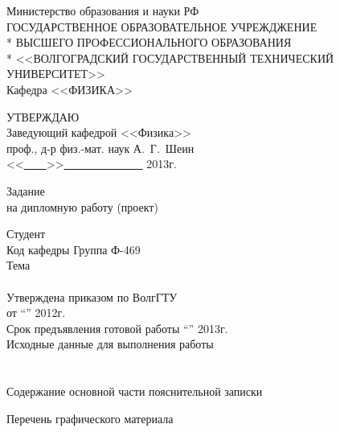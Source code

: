 \begin{titlepage}
\begin{center}
Министерство образования и науки РФ \\
\vspace{.5cm}
ГОСУДАРСТВЕННОЕ ОБРАЗОВАТЕЛЬНОЕ УЧРЕЖДЖЕНИЕ\\*
ВЫСШЕГО ПРОФЕССИОНАЛЬНОГО ОБРАЗОВАНИЯ\\*
<<ВОЛГОГРАДСКИЙ ГОСУДАРСТВЕННЫЙ ТЕХНИЧЕСКИЙ УНИВЕРСИТЕТ>>\\
\vspace{.5cm}
Кафедра <<ФИЗИКА>>
\vspace{.5cm}
\end{center}
\begin{flushright}
УТВЕРЖДАЮ\\
Заведующий кафедрой <<Физика>>\\
проф., д-р физ.-мат. наук А.~Г.~Шеин\\
\vspace{1cm}
<<\underline{\ \ \ \ }>>\underline{\ \ \ \ \ \ \ \ \ \ \ \ \ \ } 2013г.
\end{flushright}
\begin{center}
\large Задание \\
\normalsize на дипломную работу (проект)
\end{center}
\begin{flushleft}
Студент \hrulefill\\
Код кафедры \underline{\hspace{3cm}}\hspace{6cm}Группа Ф-469\\
Тема \hrulefill\\
\hrulefill\\
Утверждена приказом по ВолгГТУ\\
от ``\underline{\hspace{2cm}}''\underline{\hspace{5cm}} 2012г. \No \underline{\hspace{3cm}}\\
Срок предъявления готовой работы ``\underline{\hspace{2cm}}''\underline{\hspace{5cm}} 2013г.\\
Исходные данные для выполнения работы\\
\hrulefill\\
\hrulefill\\
Содержание основной части пояснительной записки

Перечень графического материала


\end{flushleft}
\end{titlepage}
